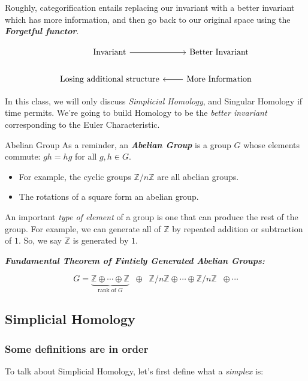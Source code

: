 \documentclass{article}
\begin{document}
\vskip 0.5cm
Roughly, categorification entails replacing our invariant with a better invariant which has more information, and then go back to our original space using the \emph{\textbf{Forgetful functor}}.

\vskip 0.5cm
\[\begin{tikzcd}
	{\text{Invariant}} & {\text{Better Invariant}} \\
	{\text{Losing additional structure}} & {\text{More Information}}
	\arrow[from=1-1, to=1-2]
	\arrow[from=2-2, to=2-1]
\end{tikzcd}\]

\vskip 0.5cm
In this class, we will only discuss \emph{Simplicial Homology}, and Singular Homology if time permits. We're going to build Homology to be the \emph{better invariant} corresponding to the Euler Characteristic.

\begin{mathdefinitionbox}{Abelian Group}
  \vskip 0.25cm
  As a reminder, an \emph{\textbf{Abelian Group}} is a group $G$ whose elements commute: $gh = hg$ for all $g,h \in G$.
  \begin{itemize}
    \item For example, the cyclic groups $\mathbb{Z}/n \mathbb{Z}$ are all abelian groups.
    \item The rotations of a square form an abelian group.
  \end{itemize}
\end{mathdefinitionbox}

\vskip 0.5cm
An important \emph{type of element} of a group is one that can produce the rest of the group. For example, we can generate all of $\mathbb{Z}$ by repeated addition or subtraction of $1$. So, we say $\mathbb{Z}$ is generated by $1$.

\vskip 0.5cm
\begin{dottedbox}
  \emph{\textbf{Fundamental Theorem of Fintiely Generated Abelian Groups:}}

  \[ G = \underbrace{\mathbb{Z} \oplus \cdots \oplus \mathbb{Z}}_{\text{rank of }G} \;\;\oplus\;\; \mathbb{Z}/n\mathbb{Z} \oplus \cdots \oplus \mathbb{Z}/n\mathbb{Z} \;\; \oplus \cdots \]
\end{dottedbox}

\vsize 1cm
\subsection{Simplicial Homology}

\subsubsection*{Some definitions are in order}
To talk about Simplicial Homology, let's first define what a \emph{simplex} is:
\end{document}
